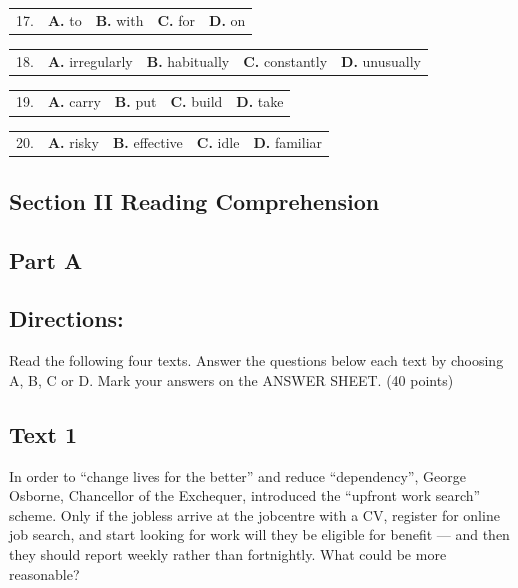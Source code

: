 \documentclass[UTF8,11pt]{ctexart}
\begin{document}
\noindent\begin{tabularx}{\linewidth}{@{}lXXXX@{}}17. & \textbf{A.} to & \textbf{B.} with & \textbf{C.} for & \textbf{D.} on\\\end{tabularx}\par

\noindent\begin{tabularx}{\linewidth}{@{}lXXXX@{}}18. & \textbf{A.} irregularly & \textbf{B.} habitually & \textbf{C.} constantly & \textbf{D.} unusually\\\end{tabularx}\par

\noindent\begin{tabularx}{\linewidth}{@{}lXXXX@{}}19. & \textbf{A.} carry & \textbf{B.} put & \textbf{C.} build & \textbf{D.} take\\\end{tabularx}\par

\noindent\begin{tabularx}{\linewidth}{@{}lXXXX@{}}20. & \textbf{A.} risky & \textbf{B.} effective & \textbf{C.} idle & \textbf{D.} familiar\\\end{tabularx}\par

\subsection*{\textbf{Section II Reading Comprehension}}


\subsection*{\textbf{Part A}}


\subsection*{\textbf{Directions:}}


Read the following four texts. Answer the questions below each text by choosing A, B, C or D. Mark your answers on the ANSWER SHEET. (40 points)


\subsection*{\textbf{Text 1}}


In order to “change lives for the better” and reduce “dependency”, George Osborne, Chancellor of the Exchequer, introduced the “upfront work search” scheme. Only if the jobless arrive at the jobcentre with a CV, register for online job search, and start looking for work will they be eligible for benefit — and then they should report weekly rather than fortnightly. What could be more reasonable?
\end{document}
